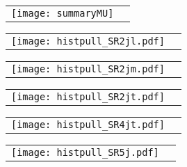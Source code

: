 \documentclass[landscape,12pt,a4paper]{article}
\begin{document}
\begin{figure}[h]\begin{center}\begin{tabular}{cc}\texttt{[image: summaryMU]}\end{tabular}\end{center}\end{figure}
\clearpage







\clearpage







\clearpage
\begin{figure}[h]\begin{center}\begin{tabular}{cc}\texttt{[image: histpull\_SR2jl.pdf]}\end{tabular}\end{center}\end{figure}
\begin{figure}[h]\begin{center}\begin{tabular}{cc}\texttt{[image: histpull\_SR2jm.pdf]}\end{tabular}\end{center}\end{figure}
\begin{figure}[h]\begin{center}\begin{tabular}{cc}\texttt{[image: histpull\_SR2jt.pdf]}\end{tabular}\end{center}\end{figure}
\begin{figure}[h]\begin{center}\begin{tabular}{cc}\texttt{[image: histpull\_SR4jt.pdf]}\end{tabular}\end{center}\end{figure}
\begin{figure}[h]\begin{center}\begin{tabular}{cc}\texttt{[image: histpull\_SR5j.pdf]}\end{tabular}\end{center}\end{figure}
\end{document}
